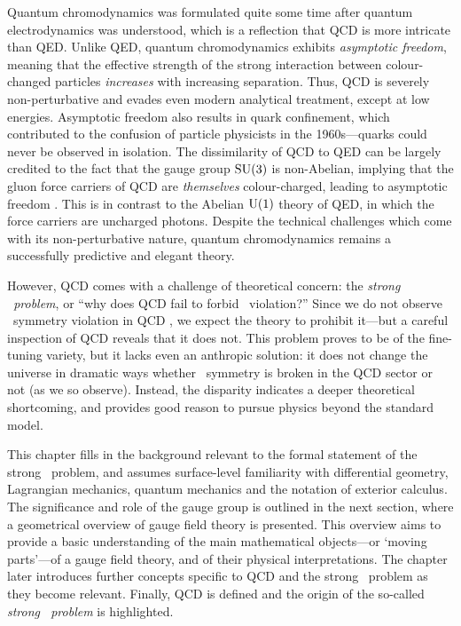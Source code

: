 Quantum chromodynamics was formulated quite some time after quantum electrodynamics was understood, which is a reflection that QCD is more intricate than QED.
Unlike QED, quantum chromodynamics exhibits \emph{asymptotic freedom}, meaning that the effective strength of the strong interaction between colour-changed particles \emph{increases} with increasing separation.
Thus, QCD is severely non-perturbative and evades even modern analytical treatment, except at low energies.
Asymptotic freedom also results in quark confinement, which contributed to the confusion of particle physicists in the 1960s---quarks could never be observed in isolation.
The dissimilarity of QCD to QED can be largely credited to the fact that the gauge group $\mathrm{SU}(3)$ is non-Abelian, implying that the gluon force carriers of QCD are \emph{themselves} colour-charged, leading to asymptotic freedom \cite{Gross_2005}.
This is in contrast to the Abelian $\mathrm{U}(1)$ theory of QED, in which the force carriers are uncharged photons.
Despite the technical challenges which come with its non-perturbative nature, quantum chromodynamics remains a successfully predictive and elegant theory.

However, QCD comes with a challenge of theoretical concern: the \emph{strong \CP\ problem}, or ``why does QCD fail to forbid \CP\ violation?''
Since we do not observe \CP\ symmetry violation in QCD \cite{ParticleDataGroup-review-2020}, we expect the theory to prohibit it---but a careful inspection of QCD reveals that it does not.
This problem proves to be of the fine-tuning variety, but it lacks even an anthropic solution: it does not change the universe in dramatic ways whether \CP\ symmetry is broken in the QCD sector or not (as we so observe).
Instead, the disparity indicates a deeper theoretical shortcoming, and provides good reason to pursue physics beyond the standard model.

This chapter fills in the background relevant to the formal statement of the strong \CP\ problem, and assumes surface-level familiarity with differential geometry, Lagrangian mechanics, quantum mechanics and the notation of exterior calculus.
The significance and role of the gauge group is outlined in the next section, where a geometrical overview of gauge field theory is presented.
This overview aims to provide a basic understanding of the main mathematical objects---or `moving parts'---of a gauge field theory, and of their physical interpretations.
The chapter later introduces further concepts specific to QCD and the strong \CP\ problem as they become relevant.
Finally, QCD is defined and the origin of the so-called \emph{strong \CP\ problem} is highlighted.


